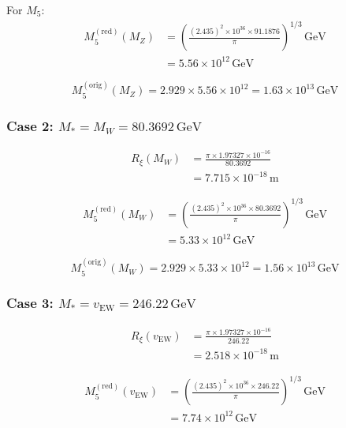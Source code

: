 \documentclass[11pt,a4paper]{article}
\newcommand{\Mfive}{M_5}
\newcommand{\Rxi}{R_\xi}
\newcommand{\MZ}{M_Z}
\newcommand{\MW}{M_W}
\newcommand{\vEW}{v_{\mathrm{EW}}}
\newcommand{\Mstar}{M_*}
\newcommand{\GeV}{\,\mathrm{GeV}}
\theoremstyle{definition}
\theoremstyle{plain}
\theoremstyle{remark}
\begin{document}
For $\Mfive$:
\begin{align}
\Mfive^{\mathrm{(red)}}(\MZ) &= \left(\frac{(2.435)^2 \times 10^{36} \times 91.1876}{\pi}\right)^{1/3}\GeV \label{eq:M5-MZ-calc} \\
&= 5.56 \times 10^{12}\GeV \label{eq:M5-MZ-red-result}
\end{align}

\begin{equation}
\Mfive^{\mathrm{(orig)}}(\MZ) = 2.929 \times 5.56 \times 10^{12} = 1.63 \times 10^{13}\GeV
\label{eq:M5-MZ-orig-result}
\end{equation}

\subsubsection{Case 2: $\Mstar = \MW = 80.3692\GeV$}

\begin{align}
\Rxi(\MW) &= \frac{\pi \times 1.97327 \times 10^{-16}}{80.3692} \label{eq:Rxi-MW-calc} \\
&= 7.715 \times 10^{-18}\,\mathrm{m} \label{eq:Rxi-MW-result}
\end{align}

\begin{align}
\Mfive^{\mathrm{(red)}}(\MW) &= \left(\frac{(2.435)^2 \times 10^{36} \times 80.3692}{\pi}\right)^{1/3}\GeV \label{eq:M5-MW-calc} \\
&= 5.33 \times 10^{12}\GeV \label{eq:M5-MW-red-result}
\end{align}

\begin{equation}
\Mfive^{\mathrm{(orig)}}(\MW) = 2.929 \times 5.33 \times 10^{12} = 1.56 \times 10^{13}\GeV
\label{eq:M5-MW-orig-result}
\end{equation}

\subsubsection{Case 3: $\Mstar = \vEW = 246.22\GeV$}

\begin{align}
\Rxi(\vEW) &= \frac{\pi \times 1.97327 \times 10^{-16}}{246.22} \label{eq:Rxi-vEW-calc} \\
&= 2.518 \times 10^{-18}\,\mathrm{m} \label{eq:Rxi-vEW-result}
\end{align}

\begin{align}
\Mfive^{\mathrm{(red)}}(\vEW) &= \left(\frac{(2.435)^2 \times 10^{36} \times 246.22}{\pi}\right)^{1/3}\GeV \label{eq:M5-vEW-calc} \\
&= 7.74 \times 10^{12}\GeV \label{eq:M5-vEW-red-result}
\end{align}
\end{document}
